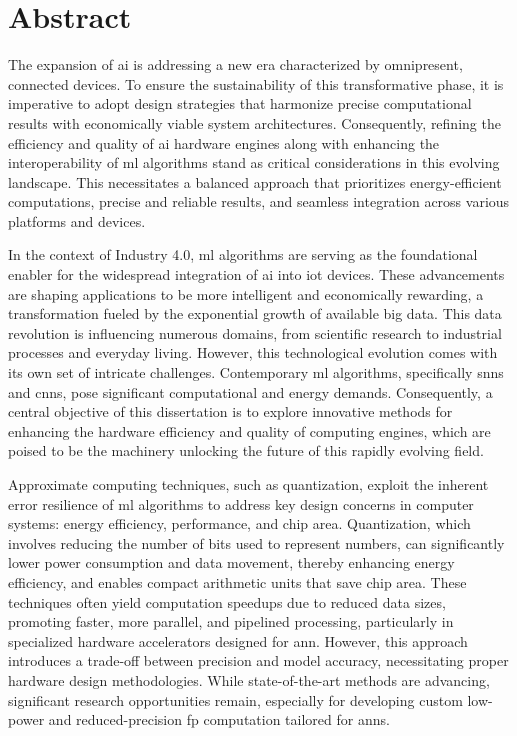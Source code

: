 \chapter*{Abstract}
\thispagestyle{empty}

The expansion of \gls{ai} is addressing a new era characterized by omnipresent, connected devices. To ensure the sustainability of this transformative phase, it is imperative to adopt design strategies that harmonize precise computational results with economically viable system architectures. Consequently, refining the efficiency and quality of \gls{ai} hardware engines along with enhancing the interoperability of \gls{ml} algorithms stand as critical considerations in this evolving landscape. This necessitates a balanced approach that prioritizes energy-efficient computations, precise and reliable results, and seamless integration across various platforms and devices.

In the context of Industry 4.0, \gls{ml} algorithms are serving as the foundational enabler for the widespread integration of \gls{ai} into \gls{iot} devices. These advancements are shaping applications to be more intelligent and economically rewarding, a transformation fueled by the exponential growth of available big data. This data revolution is influencing numerous domains, from scientific research to industrial processes and everyday living. However, this technological evolution comes with its own set of intricate challenges. Contemporary \gls{ml} algorithms, specifically \glspl{snn} and \glspl{cnn}, pose significant computational and energy demands. Consequently, a central objective of this dissertation is to explore innovative methods for enhancing the hardware efficiency and quality of computing engines, which are poised to be the machinery unlocking the future of this rapidly evolving field.

Approximate computing techniques, such as quantization, exploit the inherent error resilience of \gls{ml} algorithms to address key design concerns in computer systems: energy efficiency, performance, and chip area. Quantization, which involves reducing the number of bits used to represent numbers, can significantly lower power consumption and data movement, thereby enhancing energy efficiency, and enables compact arithmetic units that save chip area. These techniques often yield computation speedups due to reduced data sizes, promoting faster, more parallel, and pipelined processing, particularly in specialized hardware accelerators designed for \gls{ann}. However, this approach introduces a trade-off between precision and model accuracy, necessitating proper hardware design methodologies. While state-of-the-art methods are advancing, significant research opportunities remain, especially for developing custom low-power and reduced-precision \gls{fp} computation tailored for \glspl{ann}.

